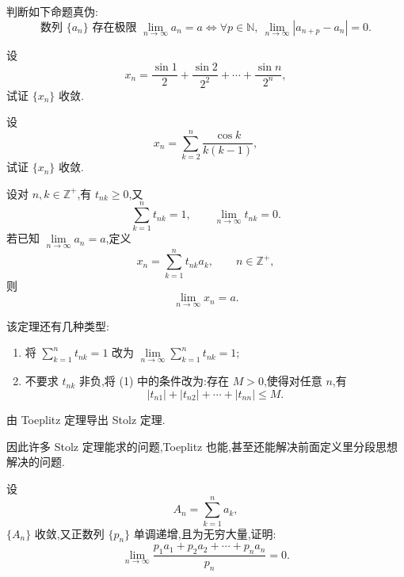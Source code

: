 \documentclass[../数学分析培优讲义.tex]{subfiles}
\begin{document}
\begin{example}
判断如下命题真伪:
\[
\text{数列 }\{a_n\}\text{ 存在极限 }\lim\limits_{n\to\infty}a_n=a
\iff
\forall p\in\mathbb N,\ \lim\limits_{n\to\infty}|a_{n+p}-a_n|=0.
\]
\end{example}
\exampleblank

\begin{example}
设
\[
x_n=\dfrac{\sin1}{2}+\dfrac{\sin2}{2^2}+\cdots+\dfrac{\sin n}{2^n},
\]
试证 $\{x_n\}$ 收敛.
\end{example}
\exampleblank

\begin{example}
设
\[
x_n=\sum\limits_{k=2}^n\dfrac{\cos k}{k(k-1)},
\]
试证 $\{x_n\}$ 收敛.
\end{example}
\exampleblank


\newpage


\begin{theorem}
设对 $n,k\in\mathbb Z^+$,有 $t_{nk}\geq0$,又
\[
\sum\limits_{k=1}^n t_{nk}=1,
\qquad
\lim\limits_{n\to\infty}t_{nk}=0.
\]
若已知 $\displaystyle \lim\limits_{n\to\infty}a_n=a$,定义
\[
x_n=\sum\limits_{k=1}^n t_{nk}a_k,\qquad n\in\mathbb Z^+,
\]
则
\[
\lim\limits_{n\to\infty}x_n=a.
\]
\end{theorem}

\begin{remark}
该定理还有几种类型:
\begin{enumerate}[label=(\arabic*)]
  \item 将 $\displaystyle \sum\limits_{k=1}^n t_{nk}=1$ 改为
  $\displaystyle \lim\limits_{n\to\infty}\sum\limits_{k=1}^n t_{nk}=1$;
  \item 不要求 $t_{nk}$ 非负,将 (1) 中的条件改为:存在 $M>0$,使得对任意 $n$,有
  \[
  |t_{n1}|+|t_{n2}|+\cdots+|t_{nn}|\leq M.
  \]
\end{enumerate}
\end{remark}

\begin{example}
由 Toeplitz 定理导出 Stolz 定理.
\end{example}
\exampleblank

\begin{remark}
因此许多 Stolz 定理能求的问题,Toeplitz 也能,甚至还能解决前面定义里分段思想解决的问题.
\end{remark}

\begin{example}
设
\[
A_n=\sum\limits_{k=1}^n a_k,
\]
$\{A_n\}$ 收敛,又正数列 $\{p_n\}$ 单调递增,且为无穷大量,证明:
\[
\lim\limits_{n\to\infty}
\dfrac{p_1a_1+p_2a_2+\cdots+p_na_n}{p_n}=0.
\]
\end{example}
\exampleblank
\end{document}

